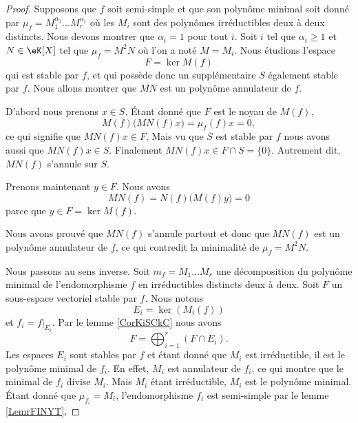 \begin{proof}

    Supposons que \( f\) soit semi-simple et que son polynôme minimal soit donné par \( \mu_f=M_1^{\alpha_1}\ldots M_r^{\alpha_r}\) où les \( M_i\) sont des polynômes irréductibles deux à deux distincts. Nous devons montrer que \( \alpha_i=1\) pour tout \( i\). Soit \( i\) tel que \( \alpha_i\geq 1\) et \( N\in \eK[X]\) tel que \( \mu_f=M^2N\) où l'on a noté \( M=M_i\). Nous étudions l'espace
    \begin{equation}
        F=\ker M(f)
    \end{equation}
    qui est stable par \( f\), et qui possède donc un supplémentaire \( S\) également stable par \( f\). Nous allons montrer que \( MN\) est un polynôme annulateur de \( f\).

    D'abord nous prenons \( x\in S\). Étant donné que \( F\) est le noyau de \( M(f)\),
    \begin{equation}
        M(f)\big( MN(f)x \big)=\mu_f(f)x=0,
    \end{equation}
    ce qui signifie que \( MN(f)x\in F\). Mais vu que \( S\) est stable par \( f\) nous avons aussi que \( MN(f)x\in S\). Finalement \( MN(f)x\in F\cap S=\{ 0 \}\). Autrement dit, \( MN(f)\) s'annule sur \( S\).

    Prenons maintenant \( y\in F\). Nous avons
    \begin{equation}
        MN(f)=N(f)\big( M(f)y \big)=0
    \end{equation}
    parce que \( y\in F=\ker M(f)\).

    Nous avons prouvé que \( MN(f)\) s'annule partout et donc que \( MN(f)\) est un polynôme annulateur de \( f\), ce qui contredit la minimalité de \( \mu_f=M^2N\).

    Nous passons au sens inverse. Soit \( m_f=M_1\ldots M_r\) une décomposition du polynôme minimal de l'endomorphisme \( f\) en irréductibles distincts deux à deux. Soit \( F\) un sous-espace vectoriel stable par \( f\). Nous notons
    \begin{equation}
        E_i=\ker(M_i(f))
    \end{equation}
    et \( f_i=f|_{E_i}\). Par le lemme \ref{CorKiSCkC} nous avons
    \begin{equation}
        F=\bigoplus_{i=1}^r(F\cap E_i).
    \end{equation}
    Les espaces \( E_i\) sont stables par \( f\) et étant donné que \( M_i\) est irréductible, il est le polynôme minimal de \( f_i\). En effet, \( M_i\) est annulateur de \( f_i\), ce qui montre que le minimal de \( f_i\) divise \( M_i\). Mais \( M_i\) étant irréductible, \( M_i\) est le polynôme minimal. Étant donné que \( \mu_{f_i}=M_i\), l'endomorphisme \( f_i\) est semi-simple par le lemme \ref{LemrFINYT}.


\end{proof}
